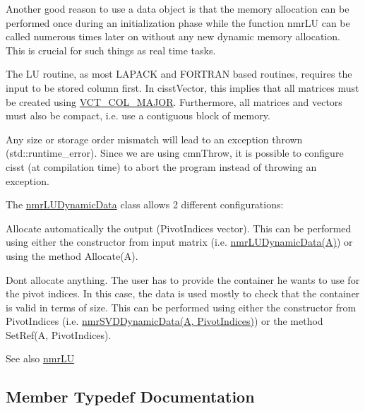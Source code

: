 Another good reason to use a data object is that the memory allocation can be performed once during an initialization phase while the function nmr\+L\+U can be called numerous times later on without any new dynamic memory allocation. This is crucial for such things as real time tasks.

The L\+U routine, as most L\+A\+P\+A\+C\+K and F\+O\+R\+T\+R\+A\+N based routines, requires the input to be stored column first. In cisst\+Vector, this implies that all matrices must be created using \hyperlink{vct_forward_declarations_8h_a432cdf8923afaf82f551450ad4034746}{V\+C\+T\+\_\+\+C\+O\+L\+\_\+\+M\+A\+J\+O\+R}. Furthermore, all matrices and vectors must also be compact, i.\+e. use a contiguous block of memory.

Any size or storage order mismatch will lead to an exception thrown (std\+::runtime\+\_\+error). Since we are using cmn\+Throw, it is possible to configure cisst (at compilation time) to abort the program instead of throwing an exception.

The \hyperlink{classnmr_l_u_dynamic_data}{nmr\+L\+U\+Dynamic\+Data} class allows 2 different configurations\+:


\begin{DoxyItemize}
\item Allocate automatically the output (Pivot\+Indices vector). This can be performed using either the constructor from input matrix (i.\+e. \hyperlink{classnmr_l_u_dynamic_data}{nmr\+L\+U\+Dynamic\+Data(\+A)}) or using the method Allocate(\+A).
\item Don\textquotesingle{}t allocate anything. The user has to provide the container he wants to use for the pivot indices. In this case, the data is used mostly to check that the container is valid in terms of size. This can be performed using either the constructor from Pivot\+Indices (i.\+e. \hyperlink{classnmr_s_v_d_dynamic_data}{nmr\+S\+V\+D\+Dynamic\+Data(\+A, Pivot\+Indices)}) or the method Set\+Ref(\+A, Pivot\+Indices).
\end{DoxyItemize}

\begin{DoxySeeAlso}{See also}
\hyperlink{nmr_l_u_8h_a66bf403c705953a781e940cf1b674d5f}{nmr\+L\+U} 
\end{DoxySeeAlso}


\subsection{Member Typedef Documentation}
\hypertarget{classnmr_l_u_dynamic_data_a5b722c87d1d635328893aa3f54ac35a1}{}
